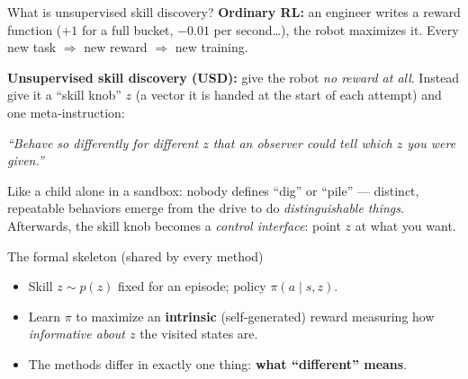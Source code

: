 \documentclass[aspectratio=169,11pt]{beamer}
\begin{document}
\begin{frame}{What is unsupervised skill discovery?}
\textbf{Ordinary RL:} an engineer writes a reward function ($+1$ for a full bucket, $-0.01$ per second\ldots), the robot maximizes it. Every new task $\Rightarrow$ new reward $\Rightarrow$ new training.

\bigskip
\textbf{Unsupervised skill discovery (USD):} give the robot \emph{no reward at all}. Instead give it a ``skill knob'' $z$ (a vector it is handed at the start of each attempt) and one meta-instruction:

\begin{center}
\emph{``Behave so differently for different $z$ that an observer could tell which $z$ you were given.''}
\end{center}

\bigskip
Like a child alone in a sandbox: nobody defines ``dig'' or ``pile'' --- distinct, repeatable behaviors emerge from the drive to do \emph{distinguishable things}. Afterwards, the skill knob becomes a \emph{control interface}: point $z$ at what you want.
\end{frame}

\begin{frame}{The formal skeleton (shared by every method)}
\begin{itemize}
  \item Skill $z \sim p(z)$ fixed for an episode; policy $\pi(a \mid s, z)$.
  \item Learn $\pi$ to maximize an \textbf{intrinsic} (self-generated) reward measuring how \emph{informative about $z$} the visited states are.
  \item The methods differ in exactly one thing: \textbf{what ``different'' means}.
\end{itemize}
\begin{center}
\end{center}
\end{frame}
\end{document}
